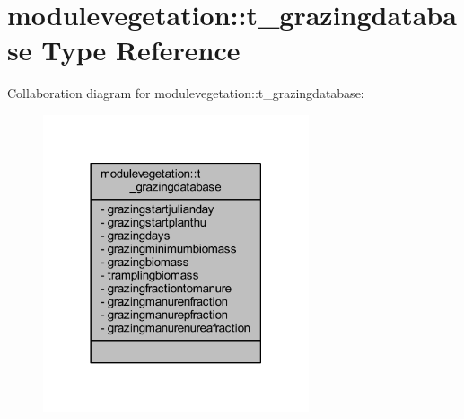 \hypertarget{structmodulevegetation_1_1t__grazingdatabase}{}\section{modulevegetation\+:\+:t\+\_\+grazingdatabase Type Reference}
\label{structmodulevegetation_1_1t__grazingdatabase}


Collaboration diagram for modulevegetation\+:\+:t\+\_\+grazingdatabase\+:\nopagebreak
\begin{figure}[H]
\begin{center}
\leavevmode
\includegraphics[width=222pt]{structmodulevegetation_1_1t__grazingdatabase__coll__graph}
\end{center}
\end{figure}
